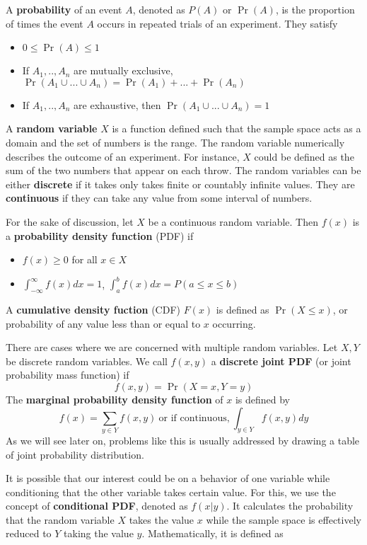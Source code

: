 A \textbf{probability} of an event $A$, denoted as $P(A)$ or $\Pr(A)$, is the proportion of times the event $A$ occurs in repeated trials of an experiment. They satisfy
\begin{itemize}
\item $0\leq\Pr(A)\leq1$
\item If $A_1,..,A_n$ are mutually exclusive, $\Pr(A_1\cup ... \cup A_n)=\Pr(A_1)+...+\Pr(A_n)$
\item If $A_1,..,A_n$ are exhaustive, then $\Pr(A_1\cup ... \cup A_n)=1$
\end{itemize} \par\medskip\medskip
A \textbf{random variable} $X$ is a function defined such that the sample space acts as a domain and the set of numbers is the range. The random variable numerically describes the outcome of an experiment. For instance, $X$ could be defined as the sum of the two numbers that appear on each throw. The random variables can be either \textbf{discrete} if it takes only takes finite or countably infinite values. They are \textbf{continuous} if they can take any value from some interval of numbers. \par\medskip\medskip
For the sake of discussion, let $X$ be a continuous random variable. Then $f(x)$ is a \textbf{probability density function} (PDF) if 
\begin{itemize}
\item $f(x)\geq 0$ for all $x\in X$
\item $\int_{-\infty}^\infty f(x)dx=1$, $\int_{a}^b f(x)dx=P(a\leq x \leq b)$
\end{itemize}
A \textbf{cumulative density fuction} (CDF) $F(x)$ is defined as $\Pr(X\leq x)$, or probability of any value less than or equal to $x$ occurring. \par\medskip\medskip
There are cases where we are concerned with multiple random variables. Let $X,Y$ be discrete random variables. We call $f(x,y)$ a \textbf{discrete joint PDF} (or joint probability mass function) if
\[
f(x,y) = \Pr(X=x, Y=y)
\]
The \textbf{marginal probability density function} of $x$ is defined by
\[
f(x) = \sum_{y\in Y}f(x,y) \ \text{or if continuous,} \ \int_{y\in Y}f(x,y)dy 
\]
As we will see later on, problems like this is usually addressed by drawing a table of joint probability distribution. \par\medskip\medskip
It is possible that our interest could be on a behavior of one variable while conditioning that the other variable takes certain value. For this, we use the concept of \textbf{conditional PDF}, denoted as $f(x|y)$. It calculates the probability that the random variable $X$ takes the value $x$ while the sample space is effectively reduced to $Y$ taking the value $y$. Mathematically, it is defined as
